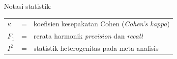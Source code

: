 \vspace{0.6cm}

\noindent Notasi statistik:

\vspace{0.2cm}

\begin{longtable}{llp{3.6in}}
	$\kappa$ & \hspace{1cm} = & koefisien kesepakatan Cohen (\emph{Cohen's kappa}) \\
	$F_1$    & \hspace{1cm} = & rerata harmonik \emph{precision} dan \emph{recall} \\
	$I^2$    & \hspace{1cm} = & statistik heterogenitas pada meta-analisis 
\end{longtable}
